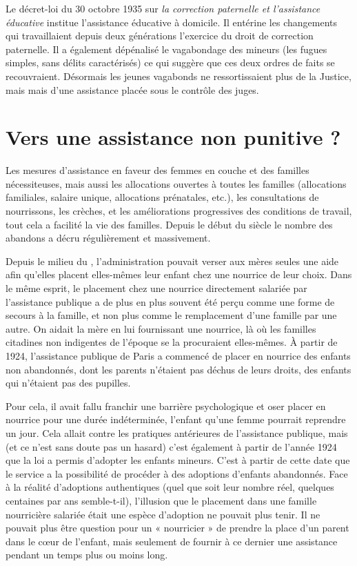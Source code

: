  Le décret-loi du 30 octobre 1935 sur {\emph{la correction paternelle et l'assistance éducative}} institue l'assistance éducative à domicile. Il entérine les changements qui travaillaient depuis deux générations l'exercice du droit de correction paternelle. Il a également dépénalisé le vagabondage des mineurs (les fugues simples, sans délits caractérisés) ce qui suggère que ces deux ordres de faits se recouvraient. Désormais les jeunes vagabonds ne ressortissaient plus de la Justice, mais mais d'une assistance placée sous le contrôle des juges. 

\section{Vers une assistance non punitive ?}

Les mesures d'assistance en faveur des femmes en couche et des familles nécessiteuses, mais aussi les allocations ouvertes à toutes les familles (allocations familiales, salaire unique, allocations prénatales, etc.), les consultations de nourrissons, les crèches, et les améliorations progressives des conditions de travail, tout cela a facilité la vie des familles. Depuis le début du siècle le nombre des abandons a décru régulièrement et massivement.


Depuis le milieu du , l'administration pouvait verser aux mères seules une aide afin qu'elles placent elles-mêmes leur enfant chez une nourrice de leur choix. Dans le même esprit, le placement chez une nourrice directement salariée par l'assistance publique a de plus en plus souvent été perçu comme une forme de secours à la famille, et non plus comme le remplacement d'une famille par une autre. On aidait la mère en lui fournissant une nourrice, là où les familles citadines non indigentes de l'époque se la procuraient elles-mêmes. À partir de 1924, l'assistance publique de Paris a commencé de placer en nourrice des enfants non abandonnés, dont les parents n'étaient pas déchus de leurs droits, des enfants qui n'étaient pas des pupilles. 

 Pour cela, il avait fallu franchir une barrière psychologique et oser placer en nourrice pour une durée indéterminée, l'enfant qu'une femme pourrait reprendre un jour. Cela allait contre les pratiques antérieures de l'assistance publique, mais (et ce n'est sans doute pas un hasard) c'est également à partir de l'année 1924 que la loi a permis d'adopter les enfants mineurs. C'est à partir de cette date que le service a la possibilité de procéder à des adoptions d'enfants abandonnés. Face à la réalité d'adoptions authentiques (quel que soit leur nombre réel, quelques centaines par ans semble-t-il), l'illusion que le placement dans une famille nourricière salariée était une espèce d'adoption ne pouvait plus tenir. Il ne pouvait plus être question pour un « nourricier » de prendre la place d'un parent dans le cœur de l'enfant, mais seulement de fournir à ce dernier une assistance pendant un temps plus ou moins long. 

